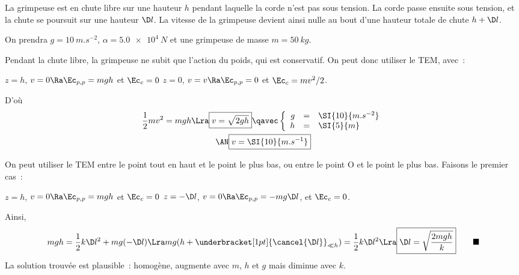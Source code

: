 \documentclass[a4paper, 11pt]{book}
\newcommand{\qed}{\tag*{$\blacksquare$}}
\renewcommand{\a}[0]{\alpha}
\begin{document}
La grimpeuse est en chute libre sur une hauteur $h$ pendant laquelle la corde
n'est pas sous tension. La corde passe ensuite sous tension, et la chute se
poursuit sur une hauteur $\D l$. La vitesse de la grimpeuse devient ainsi nulle
au bout d'une hauteur totale de chute $h+\D l$.

On prendra $g = \SI{10}{m.s^{-2}}$, $\a = \SI{5.0e4}{N}$ et une grimpeuse de
masse $m = \SI{50}{kg}$. \bigbreak

{Pendant la chute libre, la grimpeuse ne subit que l'action du poids,
    qui est conservatif. On peut donc utiliser le TEM, avec~:
    \begin{itemize}[label=$\diamond$]
         $z = h$, $v=0 \Ra \Ec_{p,p} = mgh$ et
            $\Ec_c = 0$
         $z = 0$, $v=v \Ra \Ec_{p,p} = 0$ et
            $\Ec_c = mv^2/2$.
    \end{itemize}
    D'où
    \begin{gather*}
        \frac{1}{2}mv^2 = mgh
        \Lra
        \boxed{v = \sqrt{2gh}}
        \qavec
        \left\{
            \begin{array}{rcl}
                g & = & \SI{10}{m.s^{-2}}\\
                h & = & \SI{5}{m}
            \end{array}
        \right.\\
        \AN
        \boxed{v = \SI{10}{m.s^{-1}}}
    \end{gather*}
}
{On peut utiliser le TEM entre le point tout en haut et le point le
    plus bas, ou entre le point O et le point le plus bas. Faisons le
    premier cas~:
    \begin{itemize}[label=$\diamond$]
         $z = h$, $v=0 \Ra \Ec_{p,p} = mgh$ et
            $\Ec_c = 0$
         $z = -\D l$, $v=0 \Ra \Ec_{p,p}
            = -mg\D l$,  et $\Ec_c = 0$.
    \end{itemize}
    Ainsi,
    \begin{gather*}
        mgh = \frac{1}{2}k\D l^2 + mg(-\D l)
        \Lra
        mg(h+\underbracket[1pt]{\cancel{\D l}}_{\ll h}) = \frac{1}{2}k\D l^2
        \Lra
        \boxed{\D l = \sqrt{\frac{2mgh}{k}}}
        \qed
    \end{gather*}
    La solution trouvée est plausible~: homogène, augmente avec $m$, $h$ et
    $g$ mais diminue avec $k$.
}
\end{document}

